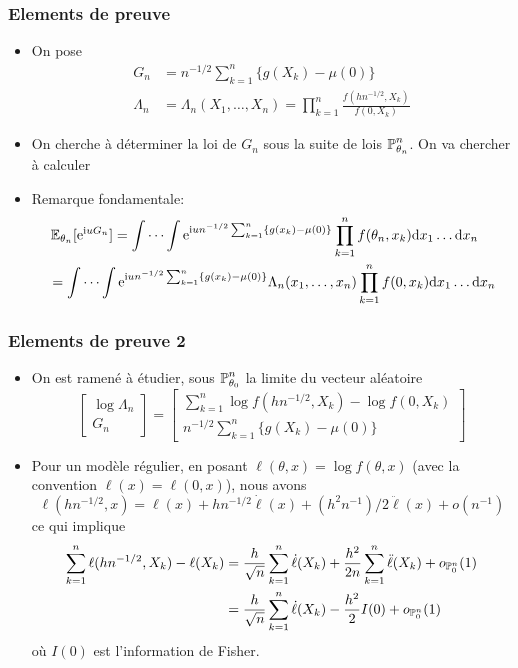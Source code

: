 \begin{frame}
\frametitle{Elements de preuve}
\begin{itemize}
\item On pose
\begin{align*}
G_n       &= n^{-1/2} \sum_{k=1}^n \{g(X_k) - \mu(0) \} \\
\Lambda_n &= \Lambda_n(X_1,\dots,X_n) = \prod_{k=1}^n \frac{f(hn^{-1/2},X_k)}{f(0,X_k)}
\end{align*}
\item On cherche à déterminer la loi de $G_n$ sous la suite de lois $\operatorname{{\mathbb P}}_{\theta_n}^n$.  On va chercher à calculer
\item \alert{Remarque fondamentale:} 
\begin{align*}
&\operatorname{{\mathbb E}}_{\theta_n}[ \mathrm{e}^{\mathrm{i} u G_n}]
= \idotsint \mathrm{e}^{\mathrm{i} u n^{-1/2} \sum_{k=1}^n \{g(x_k) - \mu(0)\}} \prod_{k=1}^n f(\theta_n,x_k) \mathrm{d} x_1 \dots \mathrm{d} x_n \\
&= \idotsint \mathrm{e}^{\mathrm{i} u n^{-1/2} \sum_{k=1}^n \{g(x_k) - \mu(0)\}} \Lambda_n(x_1,\dots,x_n) \prod_{k=1}^n f(0,x_k) \mathrm{d} x_1 \dots \mathrm{d} x_n
\end{align*}
\end{itemize}
\end{frame}

\begin{frame}
\frametitle{Elements de preuve 2}
\begin{itemize}
\item On est ramené à étudier, sous $\operatorname{{\mathbb P}}_{\theta_0}^n$ la limite du vecteur aléatoire
\[
\left[\begin{array}{c}
  \log \Lambda_n \\
  G_n
\end{array}
\right]
=
\left[\begin{array}{c}
   \sum_{k=1}^n \log f(hn^{-1/2},X_k) - \log f(0,X_k)  \\
   n^{-1/2} \sum_{k=1}^n \{ g(X_k) - \mu(0)\}
 \end{array}
\right]
\]
\item Pour un modèle régulier, en posant $\ell(\theta,x)= \log f(\theta,x)$ (avec la convention $\ell(x)= \ell(0,x)$),
nous avons
\[
\ell(hn^{-1/2},x)= \ell(x) + h n^{-1/2} \dot\ell(x) + (h^2 n^{-1})/2 \ddot \ell(x) + o(n^{-1})
\]
ce qui implique
\begin{align*}
 \sum_{k=1}^n \ell (hn^{-1/2},X_k) - \ell(X_k)
 &= \frac{h}{\sqrt{n}} \sum_{k=1}^n \dot\ell(X_k) + \frac{h^2}{2n} \sum_{k=1}^n \ddot \ell(X_k) + o_{\operatorname{{\mathbb P}}_0^n}(1) \\
 &= \frac{h}{\sqrt{n}} \sum_{k=1}^n \dot\ell(X_k) - \frac{h^2}{2} I(0)  + o_{\operatorname{{\mathbb P}}_0^n}(1)
\end{align*}
où $I(0)$ est l'information de Fisher.
\end{itemize}
\end{frame}

